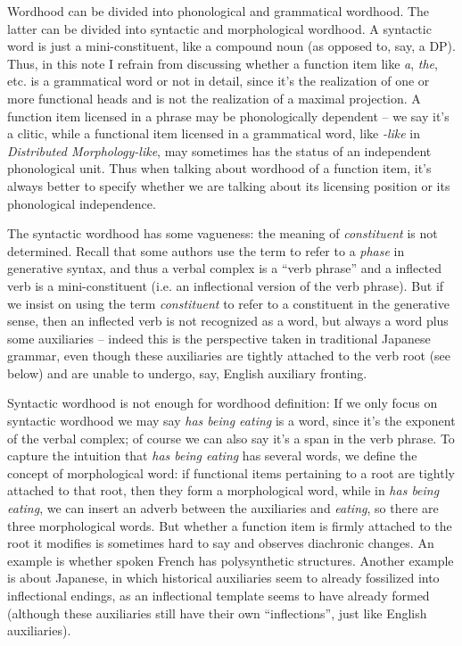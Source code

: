 \documentclass[UTF8, a4paper, oneside, scheme=plain, 12pt]{ctexbook}
\newcommand*{\term}[1]{\emph{#1}}
\newcommand{\form}[1]{\emph{#1}}
\begin{document}
{Wordhood can be divided into phonological and grammatical wordhood.
The latter can be divided into syntactic and morphological wordhood.
A syntactic word is just a mini-constituent,
like a compound noun (as opposed to, say, a DP).
Thus, in this note I refrain from discussing whether a function item 
like \form{a}, \form{the}, etc. 
is a grammatical word or not in detail,
since it's the realization of one or more functional heads
and is not the realization of a maximal projection.
A function item licensed in a phrase
may be phonologically dependent -- we say it's a clitic,
while a functional item licensed in a grammatical word, 
like \form{-like} in \form{Distributed Morphology-like},
may sometimes has the status of an independent phonological unit.
Thus when talking about wordhood of a function item,
it's always better to specify whether we are talking about its 
licensing position or its phonological independence.

The syntactic wordhood has some vagueness:
the meaning of \term{constituent} is not determined.
Recall that some authors use the term to refer to a \emph{phase} in generative syntax,
and thus a verbal complex is a ``verb phrase'' 
and a inflected verb is a mini-constituent (i.e. an inflectional version of the verb phrase).
But if we insist on using the term \term{constituent} 
to refer to a constituent in the generative sense, 
then an inflected verb is not recognized as a word, 
but always a word plus some auxiliaries -- 
indeed this is the perspective taken in traditional Japanese grammar,
even though these auxiliaries are tightly attached to the verb root (see below)
and are unable to undergo, say, English auxiliary fronting.

Syntactic wordhood is not enough for wordhood definition:
If we only focus on syntactic wordhood 
we may say \form{has being eating} is a word,
since it's the exponent of the verbal complex;
of course we can also say it's a span in the verb phrase.
To capture the intuition that \form{has being eating} has several words, 
we define the concept of morphological word:
if functional items pertaining to a root 
are tightly attached to that root, 
then they form a morphological word,
while in \form{has being eating},
we can insert an adverb between the auxiliaries and \form{eating},
so there are three morphological words.
But whether a function item is firmly attached to the root it modifies is sometimes hard to say 
and observes diachronic changes. 
An example is whether spoken French has polysynthetic structures.
Another example is about Japanese, 
in which historical auxiliaries seem to already fossilized into inflectional endings,
as an inflectional template seems to have already formed
(although these auxiliaries still have their own ``inflections'',
just like English auxiliaries).

}
\end{document}
